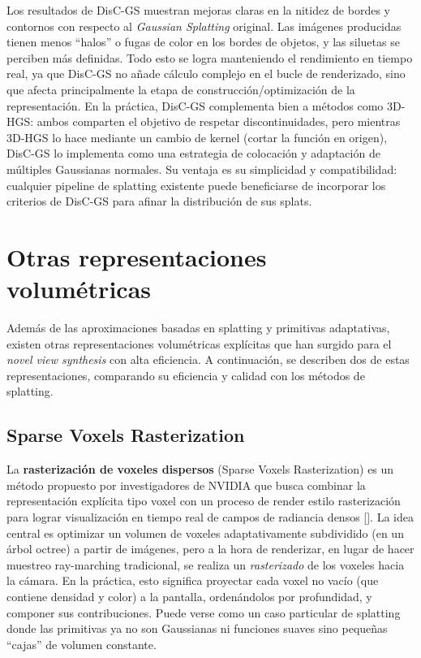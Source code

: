 Los resultados de DisC-GS muestran mejoras claras en la nitidez de bordes y contornos con respecto al \textit{Gaussian Splatting} original. Las imágenes producidas tienen menos “halos” o fugas de color en los bordes de objetos, y las siluetas se perciben más definidas. Todo esto se logra manteniendo el rendimiento en tiempo real, ya que DisC-GS no añade cálculo complejo en el bucle de renderizado, sino que afecta principalmente la etapa de construcción/optimización de la representación. En la práctica, DisC-GS complementa bien a métodos como 3D-HGS: ambos comparten el objetivo de respetar discontinuidades, pero mientras 3D-HGS lo hace mediante un cambio de kernel (cortar la función en origen), DisC-GS lo implementa como una estrategia de colocación y adaptación de múltiples Gaussianas normales. Su ventaja es su simplicidad y compatibilidad: cualquier pipeline de splatting existente puede beneficiarse de incorporar los criterios de DisC-GS para afinar la distribución de sus splats. 

\section{Otras representaciones volumétricas}

Además de las aproximaciones basadas en splatting y primitivas adaptativas, existen otras representaciones volumétricas explícitas que han surgido para el \textit{novel view synthesis} con alta eficiencia. A continuación, se describen dos de estas representaciones, comparando su eficiencia y calidad con los métodos de splatting.

\subsection{Sparse Voxels Rasterization}

La \textbf{rasterización de voxeles dispersos} (Sparse Voxels Rasterization) es un método propuesto por investigadores de NVIDIA que busca combinar la representación explícita tipo voxel con un proceso de render estilo rasterización para lograr visualización en tiempo real de campos de radiancia densos [\cite{sun2024sparse}]. La idea central es optimizar un volumen de voxeles adaptativamente subdividido (en un árbol octree) a partir de imágenes, pero a la hora de renderizar, en lugar de hacer muestreo ray-marching tradicional, se realiza un \textit{rasterizado} de los voxeles hacia la cámara. En la práctica, esto significa proyectar cada voxel no vacío (que contiene densidad y color) a la pantalla, ordenándolos por profundidad, y componer sus contribuciones. Puede verse como un caso particular de splatting donde las primitivas ya no son Gaussianas ni funciones suaves sino pequeñas “cajas” de volumen constante.

